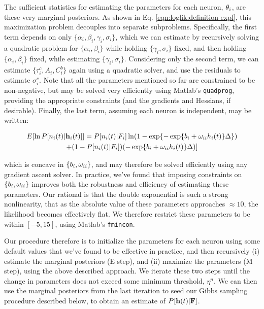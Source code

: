The sufficient statistics for estimating the parameters for each neuron, $\mathbf{\theta}_i$, are these very marginal posteriors.  As shown in Eq. \eqref{eqn:loglik:definition-expl}, this maximization problem decouples into separate subproblems.  Specifically, the first term depends on only $\{\alpha_i, \beta_i, \gamma_i, \sigma_i\}$, which we can estimate by recursively solving a quadratic problem for $\{\alpha_i, \beta_i\}$ while holding $\{\gamma_i, \sigma_i\}$ fixed, and then holding $\{\alpha_i, \beta_i\}$ fixed, while estimating $\{\gamma_i,\sigma_i\}$.  Considering only the second term, we can estimate $\{\tau_i^c, A_i, C_i^b\}$ again using a quadratic solver, and use the residuals to estimate $\sigma_i^c$.  Note that all the parameters mentioned so far are constrained to be non-negative, but may be solved very efficiently using Matlab's \texttt{quadprog}, providing the appropriate constraints (and the gradients and Hessians, if desirable).  Finally, the last term, assuming each neuron is independent, may be written:

\begin{multline} \label{eqn:bw}
	E [\ln P[n_i(t) | \mathbf{h}_i(t)]] = P[n_i(t) | F_i] \ln (1-\exp\{-\exp\{b_i + \omega_{ii} h_i(t)\}\Delta\})
	\\ +  (1-P[n_i(t) | F_i]) (-\exp\{b_i + \omega_{ii} h_i(t)\}\Delta)] 
\end{multline}

\noindent which is concave in $\{b_i, \omega_{ii}\}$, and may therefore be solved efficiently using any gradient ascent solver. In practice, we've found that imposing constraints on $\{b_i, \omega_{ii}\}$ improves both the robustness and efficiency of estimating these parameters.  Our rational is that the double exponential is such a strong nonlinearity, that as the absolute value of these parameters approaches $\approx 10$, the likelihood becomes effectively flat.  We therefore restrict these parameters to be within $[-5,15]$, using Matlab's \texttt{fmincon}.

Our procedure therefore is to initialize the parameters for each neuron using some default values that we've found to be effective in practice, and then recursively (i) estimate the marginal posteriors (E step), and (ii) maximize the parameters (M step), using the above described approach.  We iterate these two steps until the change in parameters does not exceed some minimum threshold, $\eta^n$.  We can then use the marginal posteriors from the last iteration to seed our Gibbs sampling procedure described below, to obtain an estimate of $P[\mathbf{h}(t) | {\bf F}]$.
